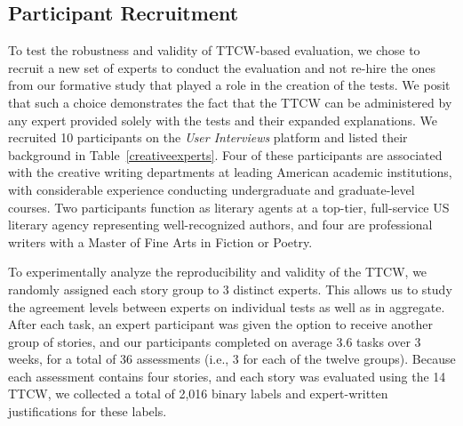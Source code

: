 \subsection{Participant Recruitment}
\label{participant}

To test the robustness and validity of TTCW-based evaluation, we chose to recruit a new set of experts to conduct the evaluation and not re-hire the ones from our formative study that played a role in the creation of the tests. We posit that such a choice demonstrates the fact that the TTCW can be administered by any expert provided solely with the tests and their expanded explanations. We recruited 10 participants on the \textit{User Interviews} platform and listed their background in Table~\ref{creativeexperts}. Four of these participants are associated with the creative writing departments at leading American academic institutions, with considerable experience conducting undergraduate and graduate-level courses. Two participants function as literary agents at a top-tier, full-service US literary agency representing well-recognized authors, and four are professional writers with a Master of Fine Arts in Fiction or Poetry.

To experimentally analyze the reproducibility and validity of the TTCW, we randomly assigned each story group to 3 distinct experts. This allows us to study the agreement levels between experts on individual tests as well as in aggregate. After each task, an expert participant was given the option to receive another group of stories, and our participants completed on average 3.6 tasks over 3 weeks, for a total of 36 assessments (i.e., 3 for each of the twelve groups). Because each assessment contains four stories, and each story was evaluated using the 14 TTCW, we collected a total of 2,016 binary labels and expert-written justifications for these labels.